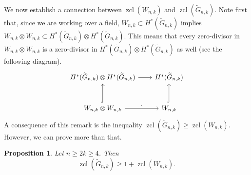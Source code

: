 \documentclass{amsart}
\newtheorem{proposition}[theorem]{Proposition}
\theoremstyle{definition}
\theoremstyle{remark}
\numberwithin{equation}{section}
\newcommand{\gr}{\widetilde G}
\newcommand{\zcl}{\operatorname{zcl}}
\renewcommand{\ge}{\geqslant}
\begin{document}
We now establish a connection between $\zcl(W_{n,k})$ and $\zcl(\gr_{n,k})$. Note first that, since we are working over a field, $W_{n,k}\subset H^*(\gr_{n,k})$ implies $W_{n,k}\otimes W_{n,k}\subset H^*(\gr_{n,k})\otimes H^*(\gr_{n,k})$. This means that 
every zero-divisor in $W_{n,k}\otimes W_{n,k}$ is a zero-divisor in $H^*(\gr_{n,k})\otimes H^*(\gr_{n,k})$ as well (see the following diagram).
\[\begin{tikzcd}[row sep = 1cm, column sep = 0.7cm]
    H^*(\gr_{n,k})\otimes H^*(\gr_{n,k})
    \arrow{r}{\cdot}
    &
    H^*(\gr_{n,k})\\
    W_{n,k}\otimes W_{n,k}
    \arrow[hook]{u}
    \arrow{r}{\cdot}
    &
    W_{n,k}
    \arrow[hook]{u}
\end{tikzcd}\]
A consequence of this remark is the inequality $\zcl(\gr_{n,k})\ge\zcl(W_{n,k})$. However, we can prove more than that.
\begin{proposition}\label{prop:zcl(Gr)>=1+zcl(W)}
    Let $n\ge2k\ge4$. Then
    \[\zcl(\gr_{n,k}) \ge 1 + \zcl(W_{n,k}).\]
\end{proposition}
\end{document}
